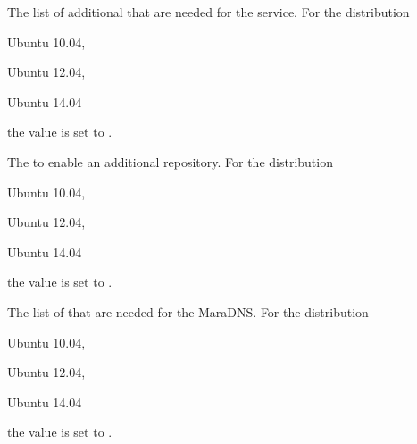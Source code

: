 
The list of additional  that are needed for the service. 
For the distribution
\begin{inparaitem}
\item[\TheDistribution{ubuntu}] Ubuntu 10.04,
\item[\TheDistribution{ubuntu}] Ubuntu 12.04,
\item[\TheDistribution{ubuntu}] Ubuntu 14.04
\end{inparaitem}
the value is set to .


The  to enable an additional repository.
For the distribution
\begin{inparaitem}
\item[\TheDistribution{ubuntu}] Ubuntu 10.04,
\item[\TheDistribution{ubuntu}] Ubuntu 12.04,
\item[\TheDistribution{ubuntu}] Ubuntu 14.04
\end{inparaitem}
the value is set to .


The list of  that are needed for the MaraDNS.
For the distribution
\begin{inparaitem}
\item[\TheDistribution{ubuntu}] Ubuntu 10.04,
\item[\TheDistribution{ubuntu}] Ubuntu 12.04,
\item[\TheDistribution{ubuntu}] Ubuntu 14.04
\end{inparaitem}
the value is set to .


